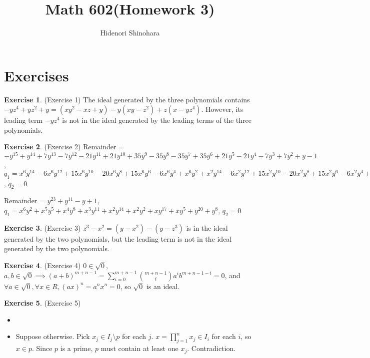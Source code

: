 \documentclass[12pt, psamsfonts]{amsart}
\theoremstyle{definition}
\newtheorem*{exer}{Exercise}
\theoremstyle{remark}
\numberwithin{equation}{section}
\begin{document}
\title{Math 602(Homework 3)}
\author{Hidenori Shinohara}
\maketitle

\section{Exercises}

\begin{exer}{(Exercise 1)}
  The ideal generated by the three polynomials contains $-yz^4 + yz^2 + y = (xy^2 - xz + y) - y(xy - z^2) + z(x - yz^4)$.
  However, its leading term $-yz^4$ is not in the ideal generated by the leading terms of the three polynomials. 
\end{exer}

\begin{exer}{(Exercise 2)}
Remainder = $-y^{15} + y^{14} + 7 y^{13} - 7 y^{12} - 21 y^{11} + 21 y^{10} + 35 y^{9} - 35 y^{8} - 35 y^{7} + 35 y^{6} + 21 y^{5} - 21 y^{4} - 7 y^{3} + 7 y^{2} + y - 1$,
$q_1 = x^{6}y^{14} - 6 x^{6}y^{12} + 15 x^{6}y^{10} - 20 x^{6}y^{8} + 15 x^{6}y^{6} - 6 x^{6}y^{4} + x^{6}y^{2} + x^{2}y^{14} - 6 x^{2}y^{12} + 15 x^{2}y^{10} - 20 x^{2}y^{8} + 15 x^{2}y^{6} - 6 x^{2}y^{4} + x^{2}y^{2}$,
$q_2 = 0$
 
Remainder = $y^{23} + y^{11} - y + 1$,
$q_1 = x^{6}y^{2} + x^{5}y^{5} + x^{4}y^{8} + x^{3}y^{11} + x^{2}y^{14} + x^{2}y^{2} + xy^{17} + xy^{5} + y^{20} + y^{8}$,
$q_2 = 0$
\end{exer}

\begin{exer}{(Exercise 3)}
  $z^3 - x^2 = (y - x^2) - (y - z^3)$ is in the ideal generated by the two polynomials, but the leading term is not in the ideal generated by the two polynomials.
\end{exer}

\begin{exer}{(Exercise 4)}
  $0 \in \sqrt{0}$, $a, b \in \sqrt{0} \implies (a + b)^{m + n - 1} = \sum_{i=0}^{m + n - 1} \binom{m + n - 1}{i} a^ib^{m + n - 1 - i} = 0$, and $\forall a \in \sqrt{0}, \forall x \in R, (ax)^n = a^nx^n = 0$, so $\sqrt{0}$ is an ideal.
\end{exer}

\begin{exer}{(Exercise 5)}
  \begin{itemize}
    \item
    \item
      Suppose otherwise.
      Pick $x_j \in I_j \setminus p$ for each $j$.
      $x = \prod_{j=1}^{n} x_j \in I_i$ for each $i$, so $x \in p$.
      Since $p$ is a prime, $p$ must contain at least one $x_j$.
      Contradiction.
  \end{itemize}
\end{exer}
\end{document}
